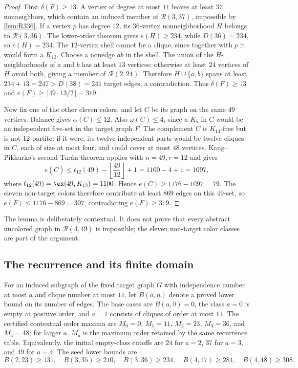 \begin{proof}
First $\delta(F)\geq13$. A vertex of degree at most $11$ leaves at least $37$ nonneighbors, which contain an induced member of $\mathcal R(3,37)$, impossible by \cref{lem:R336}. If a vertex $p$ has degree $12$, its $36$-vertex nonneighborhood $H$ belongs to $\mathcal R(3,36)$. The lower-order theorem gives $e(H)\geq234$, while $D(36)=234$, so $e(H)=234$. The $12$-vertex shell cannot be a clique, since together with $p$ it would form a $K_{13}$. Choose a nonedge $ab$ in the shell. The union of the $H$-neighborhoods of $a$ and $b$ has at least $13$ vertices: otherwise at least $24$ vertices of $H$ avoid both, giving a member of $\mathcal R(2,24)$. Therefore $H\cup\{a,b\}$ spans at least $234+13=247>D(38)=241$ target edges, a contradiction. Thus $\delta(F)\geq13$ and $e(F)\geq\lceil49\cdot13/2\rceil=319$.

Now fix one of the other eleven colors, and let $C$ be its graph on the same $49$ vertices. Balance gives $\alpha(C)\leq12$. Also $\omega(C)\leq4$, since a $K_5$ in $C$ would be an independent five-set in the target graph $F$. The complement $\overline C$ is $K_{13}$-free but is not $12$-partite: if it were, its twelve independent parts would be twelve cliques in $C$, each of size at most four, and could cover at most $48$ vertices. Kang--Pikhurko's second-Tur\'an theorem applies with $n=49,r=12$ and gives
\[
e(\overline C)\leq t_{12}(49)-\left\lfloor\frac{49}{12}\right\rfloor+1
=1100-4+1=1097,
\]
where $t_{12}(49)=\ex(49,K_{13})=1100$. Hence $e(C)\geq1176-1097=79$. The eleven non-target colors therefore contribute at least $869$ edges on this $49$-set, so $e(F)\leq1176-869=307$, contradicting $e(F)\geq319$.
\end{proof}

The lemma is deliberately contextual. It does not prove that every abstract uncolored graph in $\mathcal R(4,49)$ is impossible; the eleven non-target color classes are part of the argument.

\subsection{The recurrence and its finite domain}

For an induced subgraph of the fixed target graph $G$ with independence number at most $a$ and clique number at most $11$, let $B(a,n)$ denote a proved lower bound on its number of edges. The base cases are $B(a,0)=0$, the class $a=0$ is empty at positive order, and $a=1$ consists of cliques of order at most $11$. The certified contextual order maxima are $M_0=0$, $M_1=11$, $M_2=23$, $M_3=36$, and $M_4=48$; for larger $a$, $M_a$ is the maximum order retained by the same recurrence table. Equivalently, the initial empty-class cutoffs are $24$ for $a=2$, $37$ for $a=3$, and $49$ for $a=4$. The seed lower bounds are
\[
B(2,23)\geq131,\quad B(3,35)\geq210,\quad
B(3,36)\geq234,\quad B(4,47)\geq284,\quad B(4,48)\geq308.
\]

